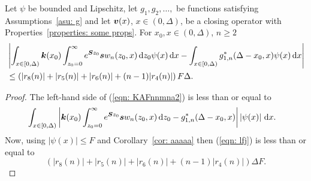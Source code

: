 \begin{cor}\label{cor: willies}
	Let \(\psi\) be bounded and Lipschitz, let \(g_1,g_2,\dots,\) be functions satisfying Assumptions~\ref{asu: g} and let \({\boldsymbol v}(x)\), \(x\in(0,\Delta)\), be a closing operator with Properties~\ref{properties: some props}. For \(x_0,x\in(0,\Delta)\), \(n\geq 2\)
	\begin{align}
		&\left| \int_{x\in[0,\Delta)}\boldsymbol k(x_0) \int_{z_0=0}^\infty e^{\boldsymbol Sz_0}\boldsymbol sw_n(z_0,x)\, \mathrm{d} z_0 \psi(x)\, \mathrm{d} x  
		- \int_{x\in[0,\Delta)} g_{1,n}^*(\Delta-x_0,x)\psi(x)\, \mathrm{d} x \right|\nonumber 
		\\&\leq \left(|r_8(n)|+|r_5(n)|+|r_6(n)| + (n-1)|r_4(n)|\right)F\Delta.\label{eqn: KAFnnmna2}
	\end{align}
\end{cor}
\begin{proof}
	The left-hand side of (\ref{eqn: KAFnnmna2}) is less than or equal to 
	\begin{align}
		& \int_{x\in[0,\Delta)} \left| \boldsymbol k(x_0) \int_{z_0=0}^\infty e^{\boldsymbol Sz_0}\boldsymbol sw_n(z_0,x)\, \mathrm{d} z_0 
		- g_{1,n}^*(\Delta-x_0,x)\right| \left|\psi(x)\right|\, \mathrm{d} x . \label{eqn: lfj}
	\end{align}
	Now, using \(|\psi(x)|\leq F\) and Corollary~\ref{cor: aaaaa} then (\ref{eqn: lfj}) is less than or equal to 
		\[\left(|r_8(n)|+|r_5(n)|+|r_6(n)| + (n-1)|r_4(n)|\right) \Delta F.\]
\end{proof}
%
%
